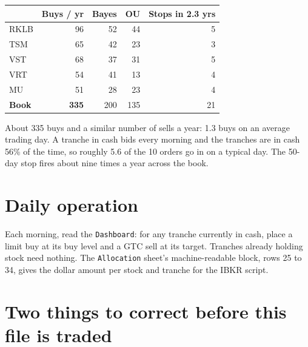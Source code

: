 \documentclass[11pt]{article}
\begin{document}
\begin{center}
\footnotesize
\begin{tabular}{@{}l r r r r@{}}
\toprule
& \textbf{Buys / yr} & \textbf{Bayes} & \textbf{OU} & \textbf{Stops in 2.3 yrs} \\
\midrule
RKLB & 96 & 52 & 44 & 5 \\
TSM  & 65 & 42 & 23 & 3 \\
VST  & 68 & 37 & 31 & 5 \\
VRT  & 54 & 41 & 13 & 4 \\
MU   & 51 & 28 & 23 & 4 \\
\midrule
\textbf{Book} & \textbf{335} & 200 & 135 & 21 \\
\bottomrule
\end{tabular}
\end{center}

About 335 buys and a similar number of sells a year: 1.3 buys on an average trading day. A
tranche in cash bids every morning and the tranches are in cash 56\% of the time, so roughly 5.6
of the 10 orders go in on a typical day. The 50-day stop fires about nine times a year across the
book.

\section{Daily operation}

Each morning, read the \texttt{Dashboard}: for any tranche currently in cash, place a limit buy at
its buy level and a GTC sell at its target. Tranches already holding stock need nothing. The
\texttt{Allocation} sheet's machine-readable block, rows 25 to 34, gives the dollar amount per
stock and tranche for the IBKR script.

\section{Two things to correct before this file is traded}
\end{document}

